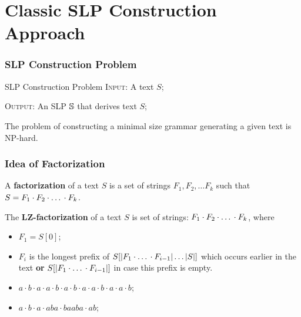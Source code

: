 \documentclass{beamer}
\begin{document}
\section{Classic SLP Construction Approach}

\begin{frame}
\frametitle{SLP Construction Problem}

\begin{block}{SLP Construction Problem}
\textsc{Input:} A text $S$;

\textsc{Output:} An SLP $\mathbb{S}$ that derives text $S$;
\end{block}

\pause

\begin{theorem}
The problem of constructing a minimal size grammar generating a given text is
NP-hard.
\end{theorem}
\end{frame}

\begin{frame}
\frametitle{Idea of Factorization}

\begin{definition}
A \textbf{factorization} of a text $S$ is a set of strings $F_1, F_2,
\dots F_k$ such that $S = F_1 \cdot F_2 \cdot \mbox{\dots} \cdot F_k$.
\end{definition}

\pause

\begin{definition}
The \textbf{LZ-factorization} of a text $S$ is set of strings: $F_1 \cdot F_2
\cdot \mbox{\dots} \cdot F_k$, where

\begin{itemize}
  \item $F_1 = S[0]$;
  \item $F_i$ is the longest prefix of $S[|F_1\cdot \mbox{\dots} \cdot
  F_{i-1}|\dots|S|]$ which occurs earlier in the text \textbf{or} $S[|F_1\cdot
\mbox{\dots} \cdot F_{i-1}|]$ in case this prefix is empty.
\end{itemize}
\end{definition}

\pause

\begin{example}
\begin{itemize}
  \item $a \cdot b \cdot a \cdot a \cdot b \cdot a \cdot b \cdot a \cdot a
  \cdot b \cdot a \cdot a \cdot b$;
  \item $a \cdot b \cdot a \cdot aba \cdot baaba \cdot ab$;
\end{itemize}
\end{example}
\end{frame}
\end{document}
